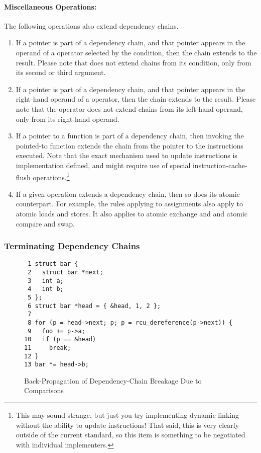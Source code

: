 \documentclass[letterpaper,twocolumn,10pt]{article}
\begin{document}
\paragraph{Miscellaneous Operations:}

The following operations also extend dependency chains.

\begin{enumerate}
\item	If a pointer is part of a dependency chain, and that pointer
	appears in the operand of a  operator selected by
	the condition, then the chain extends to the result.
	Please note that  does not extend chains from its
	condition, only from its second or third argument.
\item	If a pointer is part of a dependency chain, and that pointer
	appears in the right-hand operand of a \co{,} operator,
	then the chain extends to the result.
	Please note that the \co{,} operator does not extend chains from its
	left-hand operand, only from its right-hand operand.
\item	If a pointer to a function is part of a dependency chain, then
	invoking the pointed-to function extends the chain from the
	pointer to the instructions executed.
	Note that the exact mechanism used to update instructions is
	implementation defined, and might require use of special
	instruction-cache-flush operations.\footnote{
		This may sound strange, but just you try implementing
		dynamic linking without the ability to update instructions!
		That said, this is very clearly outside of the current
		standard, so this item is something to be negotiated
		with individual implementers.}
\item	If a given operation extends a dependency chain, then so does
	its atomic counterpart.
	For example, the rules applying to assignments also apply to
	atomic loads and stores.
	It also applies to atomic exchange and and atomic compare
	and swap.
\end{enumerate}

\subsubsection{Terminating Dependency Chains}
\label{sec:Terminating Dependency Chains}

\begin{figure}[tbp]
{ \scriptsize
\begin{verbatim}
 1 struct bar {
 2   struct bar *next;
 3   int a;
 4   int b;
 5 };
 6 struct bar *head = { &head, 1, 2 };
 7 
 8 for (p = head->next; p; p = rcu_dereference(p->next)) {
 9   foo += p->a;
10   if (p == &head)
11     break;
12 }
13 bar *= head->b;
\end{verbatim}
}
\caption{Back-Propagation of Dependency-Chain Breakage Due to Comparisons}
\label{fig:Back-Propagation of Dependency-Chain Breakage Due to Comparisons}
\end{figure}
\end{document}
